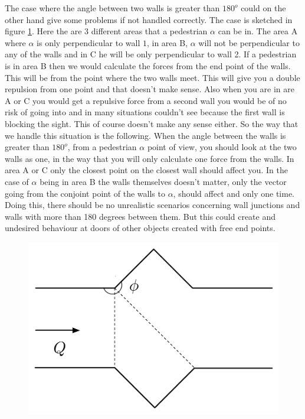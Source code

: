 The case where the angle between two walls is greater than $180^o$ could on the 
other hand give some problems if not handled correctly. The case is sketched in 
figure \ref{fig:wallcase}. Here the are 3 different areas that a pedestrian $\alpha$ 
can be in. The area A where $\alpha$ is only perpendicular to wall $1$, in area B, 
$\alpha$ will not be perpendicular to any of the walls and in C he will be only 
perpendicular to wall 2. If a pedestrian is in area B then we would calculate the 
forces from the end point of the walls. This will be from the point where the two 
walls meet. This will give you a double repulsion from one point and that 
doesn't make sense. Also when you are in are A or C you would get a repulsive force 
from a second wall you would be of no risk of going into and in many situations 
couldn't see because the first wall is blocking the sight. This of course doesn't 
make any sense either. So the way that we handle this situation is the following. 
When the angle between the walls is greater than $180^o$, from a pedestrian $\alpha$ 
point of view, you should look at the two walls as one, in the way that you will 
only calculate one force from the walls. In area A or C only the closest point 
on the closest wall should affect you. In the case of $\alpha$ being in area B 
the walls themselves doesn't matter, only the vector going from the conjoint 
point of the walls to $\alpha$, should affect and only one time. Doing this, 
there should be no unrealistic scenarios concerning wall junctions and walls 
with more than 180 degrees between them. But this could create and undesired 
behaviour at doors of other objects created with free end points.

\begin{figure}[ht]
\centering
\includegraphics[scale=0.45]{Figures/WallCase.pdf} 
\caption{}\label{fig:wallcase}
\end{figure}


